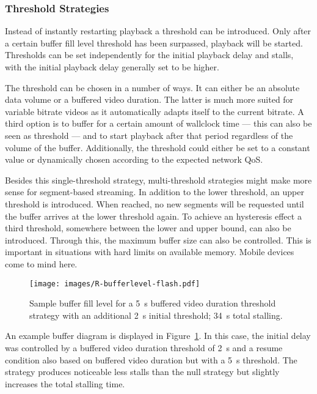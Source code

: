 \subsubsection{Threshold Strategies}

Instead of instantly restarting playback a threshold can be introduced. Only after a certain buffer fill level threshold has been surpassed, playback will be started. Thresholds can be set independently for the initial playback delay and stalls, with the initial playback delay generally set to be higher.

The threshold can be chosen in a number of ways. It can either be an absolute data volume or a buffered video duration. The latter is much more suited for variable bitrate videos as it automatically adapts itself to the current bitrate. A third option is to buffer for a certain amount of wallclock time --- this can also be seen as threshold --- and to start playback after that period regardless of the volume of the buffer. Additionally, the threshold could either be set to a constant value or dynamically chosen according to the expected network \gls{QoS}.

Besides this single-threshold strategy, multi-threshold strategies might make more sense for segment-based streaming. In addition to the lower threshold, an upper threshold is introduced. When reached, no new segments will be requested until the buffer arrives at the lower threshold again. To achieve an hysteresis effect a third threshold, somewhere between the lower and upper bound, can also be introduced. 
Through this, the maximum buffer size can also be controlled. This is important in situations with hard limits on available memory. Mobile devices come to mind here.


\begin{figure}[htb]
	\centering
	\texttt{[image: images/R-bufferlevel-flash.pdf]}
	\caption{Sample buffer fill level for a \SI{5}{\second} buffered video duration threshold strategy with an additional \SI{2}{\second} initial threshold; \SI{34}{\second} total stalling.}
\label{c3:fig:bufferlevel-flash}
\end{figure}

An example buffer diagram is displayed in Figure~\ref{c3:fig:bufferlevel-flash}. In this case, the initial delay was controlled by a buffered video duration threshold of \SI{2}{\second} and a resume condition also based on buffered video duration but with a \SI{5}{\second} threshold. The strategy produces noticeable less stalls than the null strategy but slightly increases the total stalling time.


